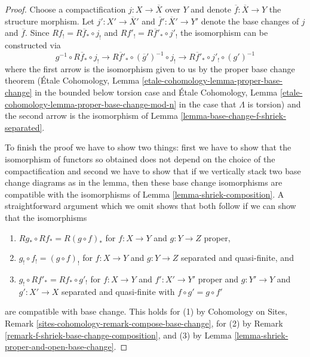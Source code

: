 \documentclass{stacks-project}
\theoremstyle{plain}
\theoremstyle{definition}
\theoremstyle{remark}
\numberwithin{equation}{subsection}
\begin{document}
\begin{proof}
Choose a compactification $j : X \to \overline{X}$ over $Y$
and denote $\overline{f} : \overline{X} \to Y$ the structure morphism.
Let $j' : X' \to \overline{X}'$ and $\overline{f}' : \overline{X}' \to Y'$
denote the base changes of $j$ and $\overline{f}$.
Since $Rf_! = R\overline{f}_* \circ j_!$ and $Rf'_! =
R\overline{f}'_* \circ j'_!$ the isomorphism can be constructed via
$$
g^{-1} \circ R\overline{f}_* \circ j_! \to
R\overline{f}'_* \circ (\overline{g}')^{-1} \circ j_! \to
R\overline{f}'_* \circ j'_! \circ (g')^{-1} 
$$
where the first arrow is the isomorphism given to us by the
proper base change theorem (\'Etale Cohomology, Lemma
\ref{etale-cohomology-lemma-proper-base-change} in the bounded below torsion
case and \'Etale Cohomology, Lemma
\ref{etale-cohomology-lemma-proper-base-change-mod-n} in the
case that $\Lambda$ is torsion) and the second arrow is the isomorphism of
Lemma \ref{lemma-base-change-f-shriek-separated}.

\medskip\noindent
To finish the proof we have to show two things: first we have to show
that the isomorphism of functors so obtained does not depend on
the choice of the compactification and second we have to show that
if we vertically stack two base change diagrams as in the lemma, then
these base change isomorphisms are compatible with the isomorphisms
of Lemma \ref{lemma-shriek-composition}.
A straightforward argument which we omit shows that both follow
if we can show that the isomorphisms
\begin{enumerate}
\item $Rg_* \circ Rf_* = R(g \circ f)_*$ for $f : X \to Y$ and $g : Y \to Z$
proper,
\item $g_! \circ f_! = (g \circ f)_!$ for $f : X \to Y$ and $g : Y \to Z$
separated and quasi-finite, and
\item $g_! \circ Rf'_* = Rf_* \circ g'_!$ for  $f : X \to Y$ and
$f' : X' \to Y'$ proper and $g : Y' \to Y$ and $g' : X' \to X$
separated and quasi-finite with $f \circ g' = g \circ f'$
\end{enumerate}
are compatible with base change. This holds for (1) by
Cohomology on Sites, Remark \ref{sites-cohomology-remark-compose-base-change},
for (2) by Remark \ref{remark-f-shriek-base-change-composition}, and
(3) by Lemma \ref{lemma-shriek-proper-and-open-base-change}.
\end{proof}
\end{document}
